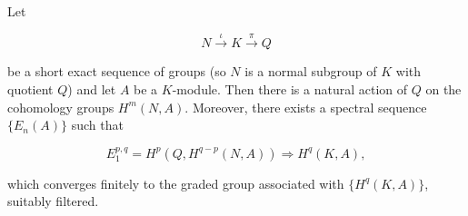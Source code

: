 Let

$$N \xrightarrow{\iota} K \xrightarrow{\pi} Q$$

be a short exact sequence of groups (so $N$ is a normal subgroup of $K$ with quotient $Q$) and let $A$ be a $K$-module. Then there is a natural action of $Q$ on the cohomology groups $H^m(N, A)$. Moreover, there exists a spectral sequence $\{E_n(A)\}$ such that

$$
E_1^{p,q} = H^p(Q, H^{q-p}(N, A)) \Rightarrow H^q(K, A),
$$

which converges finitely to the graded group associated with $\{H^q(K, A)\}$, suitably filtered.
